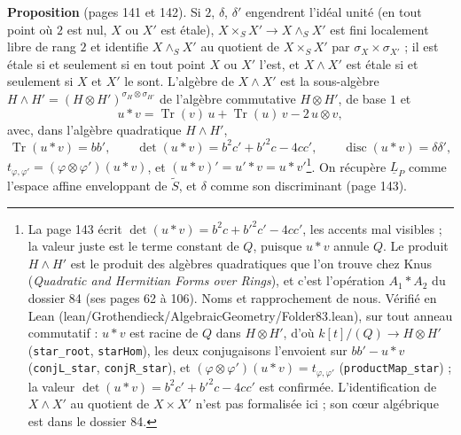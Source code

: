\documentclass[11pt,a4paper]{article}
\begin{document}
\textbf{Proposition} (pages 141 et 142). Si $2$, $\delta$, $\delta'$ engendrent
l'idéal unité (en tout point où $2$ est nul, $X$ ou $X'$ est étale), $X \times_S
X' \to X \wedge_S X'$ est fini localement libre de rang $2$ et identifie $X
\wedge_S X'$ au quotient de $X \times_S X'$ par $\sigma_X \times \sigma_{X'}$ ;
il est étale si et seulement si en tout point $X$ ou $X'$ l'est, et $X \wedge
X'$ est étale si et seulement si $X$ et $X'$ le sont. L'algèbre de $X \wedge
X'$ est la sous-algèbre $H \wedge H' = (H \otimes H')^{\sigma_H \otimes
\sigma_{H'}}$ de l'algèbre commutative $H \otimes H'$, de base $1$ et
\[
  u * v = \operatorname{Tr}(v)\,u + \operatorname{Tr}(u)\,v - 2\,u \otimes v,
\]
avec, dans l'algèbre quadratique $H \wedge H'$,
\[
  \operatorname{Tr}(u * v) = bb',\qquad \det(u * v) = b^2c' + b'^2c - 4cc',
  \qquad \operatorname{disc}(u * v) = \delta\delta' ,
\]
$t_{\varphi, \varphi'} = (\varphi \otimes \varphi')(u * v)$, et $(u * v)' = u' *
v = u * v'$\footnote{La page 143 écrit $\det(u * v) = b^2c + b'^2c' - 4cc'$, les
accents mal visibles ; la valeur juste est le terme constant de $Q$, puisque
$u * v$ annule $Q$. Le produit $H \wedge H'$ est le produit des algèbres
quadratiques que l'on trouve chez Knus (\emph{Quadratic and Hermitian Forms
over Rings}), et c'est l'opération $A_1 * A_2$ du dossier 84 (ses pages 62 à
106). Noms et rapprochement de nous. Vérifié en Lean
(lean/Grothendieck/AlgebraicGeometry/Folder83.lean), sur tout anneau commutatif : $u * v$ est
racine de $Q$ dans $H \otimes H'$, d'où $k[t]/(Q) \to H \otimes H'$
(\texttt{star\_root}, \texttt{starHom}), les deux conjugaisons l'envoient sur
$bb' - u * v$ (\texttt{conjL\_star}, \texttt{conjR\_star}), et $(\varphi
\otimes \varphi')(u * v) = t_{\varphi, \varphi'}$ (\texttt{productMap\_star}) ;
la valeur $\det(u * v) = b^2c' + b'^2c - 4cc'$ est confirmée. L'identification
de $X \wedge X'$ au quotient de $X \times X'$ n'est pas formalisée ici ; son
cœur algébrique est dans le dossier 84.}. On récupère $\underline{L}_P$ comme
l'espace affine enveloppant de $\widetilde{S}$, et $\delta$ comme son
discriminant (page 143).
\end{document}
